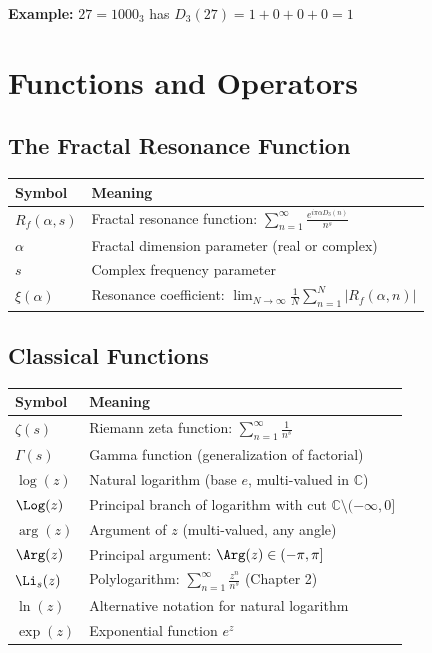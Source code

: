 \textbf{Example:} $27 = 1000_3$ has $D_3(27) = 1 + 0 + 0 + 0 = 1$

\section*{Functions and Operators}

\subsection*{The Fractal Resonance Function}

\begin{center}
\begin{tabular}{ll}
\toprule
\textbf{Symbol} & \textbf{Meaning} \\
\midrule
$R_f(\alpha, s)$ & Fractal resonance function: $\sum_{n=1}^{\infty} \frac{e^{i\pi\alpha D_3(n)}}{n^s}$ \\
$\alpha$ & Fractal dimension parameter (real or complex) \\
$s$ & Complex frequency parameter \\
$\xi(\alpha)$ & Resonance coefficient: $\lim_{N \to \infty} \frac{1}{N}\sum_{n=1}^{N} |R_f(\alpha, n)|$ \\
\bottomrule
\end{tabular}
\end{center}

\subsection*{Classical Functions}

\begin{center}
\begin{tabular}{ll}
\toprule
\textbf{Symbol} & \textbf{Meaning} \\
\midrule
$\zeta(s)$ & Riemann zeta function: $\sum_{n=1}^{\infty} \frac{1}{n^s}$ \\
$\Gamma(s)$ & Gamma function (generalization of factorial) \\
$\log(z)$ & Natural logarithm (base $e$, multi-valued in $\mathbb{C}$) \\
$\Log(z)$ & Principal branch of logarithm with cut $\mathbb{C} \setminus (-\infty, 0]$ \\
$\arg(z)$ & Argument of $z$ (multi-valued, any angle) \\
$\Arg(z)$ & Principal argument: $\Arg(z) \in (-\pi, \pi]$ \\
$\Li_s(z)$ & Polylogarithm: $\sum_{n=1}^{\infty} \frac{z^n}{n^s}$ (Chapter 2) \\
$\ln(z)$ & Alternative notation for natural logarithm \\
$\exp(z)$ & Exponential function $e^z$ \\
\bottomrule
\end{tabular}
\end{center}

